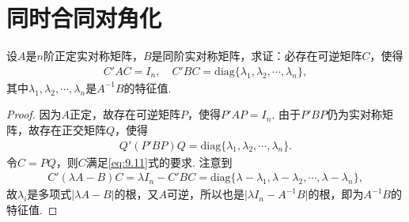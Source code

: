 \documentclass[../../main.tex]{subfiles}%
\begin{document}
\section{同时合同对角化}

\begin{proposition}[同时合同对角化]\label{proposition:例9.75}
设\(A\)是\(n\)阶正定实对称矩阵，\(B\)是同阶实对称矩阵，求证：必存在可逆矩阵\(C\)，使得
\begin{align}
C'AC = I_n,\quad C'BC = \mathrm{diag}\{\lambda_1,\lambda_2,\cdots,\lambda_n\},\label{eq:9.11}
\end{align}
其中\(\lambda_1,\lambda_2,\cdots,\lambda_n\)是\(A^{-1}B\)的特征值.
\end{proposition}
\begin{proof}

因为\(A\)正定，故存在可逆矩阵\(P\)，使得\(P'AP = I_n\). 由于\(P'BP\)仍为实对称矩阵，故存在正交矩阵\(Q\)，使得
\begin{align*}
Q'(P'BP)Q = \mathrm{diag}\{\lambda_1,\lambda_2,\cdots,\lambda_n\}.
\end{align*}
令\(C = PQ\)，则\(C\)满足\eqref{eq:9.11}式的要求. 注意到
\begin{align*}
C'(\lambda A - B)C=\lambda I_n - C'BC = \mathrm{diag}\{\lambda - \lambda_1,\lambda - \lambda_2,\cdots,\lambda - \lambda_n\},
\end{align*}
故\(\lambda_i\)是多项式\(\vert\lambda A - B\vert\)的根，又\(A\)可逆，所以也是\(\vert\lambda I_n - A^{-1}B\vert\)的根，即为\(A^{-1}B\)的特征值. 

\end{proof}
\end{document}
